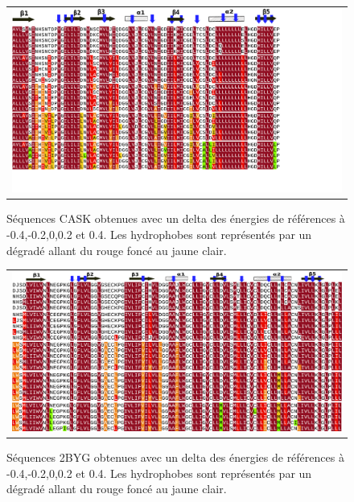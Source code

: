    \clearpage

\begin{landscape}

   \begin{figure}[t]
     \centering
     \begin{tabular}{c}
       \includegraphics[width=20cm]{boost_hydro/modelA/alignCASK_V2.png} \\
     \end{tabular}
     \caption{Séquences CASK obtenues avec un delta des énergies de références à -0.4,-0.2,0,0.2 et 0.4. Les hydrophobes sont représentés par un dégradé allant du rouge foncé au jaune clair.}
\label{result:PDZ_seed}
   \end{figure}
\end{landscape}

   \clearpage

\begin{landscape}

   \begin{figure}[t]
     \centering
     \begin{tabular}{c}
       \includegraphics[width=20cm]{boost_hydro/modelA/align2BYG_V2.png} \\
     \end{tabular}
     \caption{Séquences 2BYG obtenues avec un delta des énergies de références à -0.4,-0.2,0,0.2 et 0.4. Les hydrophobes sont représentés par un dégradé allant du rouge foncé au jaune clair.}
\label{result:PDZ_seed}
   \end{figure}
\end{landscape}
   
